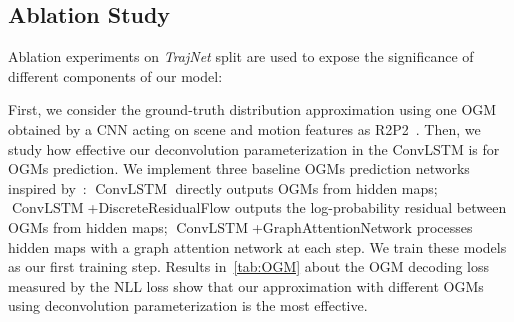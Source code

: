 \documentclass[10pt,twocolumn,letterpaper]{article}
\begin{document}
\begin{table}
    \centering
{}
	\vspace{-0.2cm}
	\caption{Results on the inD in the long-term 30-second prediction.}
	\label{tab:inD}
\end{table}


\subsection{Ablation Study}
Ablation experiments on \textit{TrajNet} split are used to expose the significance of different components of our model:

 First, we consider the ground-truth distribution approximation using one OGM obtained by a CNN acting on scene and motion features as R2P2~\cite{rhinehart2018r2p2}. Then, we study how effective our deconvolution parameterization in the ConvLSTM is for OGMs prediction. We implement three baseline OGMs prediction networks inspired by~\cite{ridel2020scene,jain2020discrete,park2020diverse}: $\operatorname{ConvLSTM}$ directly outputs OGMs from hidden maps; $\operatorname{ConvLSTM}$+DiscreteResidualFlow outputs the log-probability residual between OGMs from hidden maps; $\operatorname{ConvLSTM}$+GraphAttentionNetwork processes hidden maps with a graph attention network at each step. We train these models as our first training step. Results in~\cref{tab:OGM} about the OGM decoding loss measured by the NLL loss show that our approximation with different OGMs using deconvolution parameterization is the most effective. 
\end{document}
